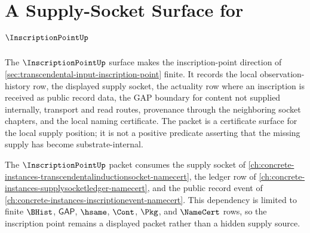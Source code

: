 \chapter{A Supply-Socket Surface for $\InscriptionPointUp$}
\label{ch:concrete-instances-inscriptionpoint-socket-namecert}

The $\InscriptionPointUp$ surface makes the inscription-point direction of \autoref{sec:transcendental-input-inscription-point} finite. It records the local observation-history row, the displayed supply socket, the actuality row where an inscription is received as public record data, the GAP boundary for content not supplied internally, transport and read routes, provenance through the neighboring socket chapters, and the local naming certificate. The packet is a certificate surface for the local supply position; it is not a positive predicate asserting that the missing supply has become substrate-internal.

The $\InscriptionPointUp$ packet consumes the supply socket of \autoref{ch:concrete-instances-transcendentalinductionsocket-namecert}, the ledger row of \autoref{ch:concrete-instances-supplysocketledger-namecert}, and the public record event of \autoref{ch:concrete-instances-inscriptionevent-namecert}. This dependency is limited to finite $\BHist$, $\mathsf{GAP}$, $\hsame$, $\Cont$, $\Pkg$, and $\NameCert$ rows, so the inscription point remains a displayed packet rather than a hidden supply source.

